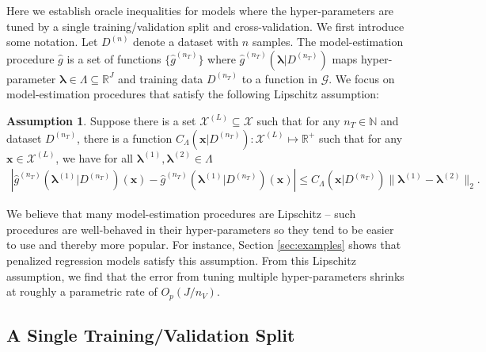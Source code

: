 \documentclass[12pt]{article} %
\theoremstyle{definition}
\newtheorem{assump}{Assumption}
\begin{document}
Here we establish oracle inequalities for models where the hyper-parameters are tuned by a single training/validation split and cross-validation. We first introduce some notation.
Let $D^{(n)}$ denote a dataset with $n$ samples. The model-estimation procedure $\hat{g}$ is a set of functions $\{\hat{g}^{(n_T)}\}$ where $\hat{g}^{(n_T)}(\boldsymbol{\lambda} | D^{(n_T)})$ maps hyper-parameter $\boldsymbol{\lambda} \in \Lambda \subseteq \mathbb{R}^J$ and training data $D^{(n_T)}$ to a function in $\mathcal{G}$.
We focus on model-estimation procedures that satisfy the following Lipschitz assumption:
\begin{assump}
	\label{assump:lipschitz}
	Suppose there is a set $\mathcal{X}^{(L)} \subseteq \mathcal{X}$ such that for any $n_T \in \mathbb{N}$ and dataset $D^{(n_T)}$, there is a function $C_\Lambda(\boldsymbol{x} | D^{(n_T)}) : \mathcal{X}^{(L)} \mapsto \mathbb{R}^+$ such that for any $\boldsymbol{x} \in \mathcal{X}^{(L)}$, we have for all $\boldsymbol{\lambda}^{(1)}, \boldsymbol{\lambda}^{(2)} \in \Lambda$
	\begin{align}
	\left |
	\hat{g}^{(n_T)}(\boldsymbol{\lambda}^{(1)}|D^{(n_T)})(\boldsymbol{x}) - \hat{g}^{(n_T)}(\boldsymbol{\lambda}^{(1)}|D^{(n_T)})(\boldsymbol{x}) \right |
	\le C_\Lambda(\boldsymbol{x}|D^{(n_T)}) \|\boldsymbol{\lambda}^{(1)} - \boldsymbol{\lambda}^{(2)}\|_2.
	\end{align}
\end{assump}
\noindent
We believe that many model-estimation procedures are Lipschitz -- such procedures are well-behaved in their hyper-parameters so they tend to be easier to use and thereby more popular.
For instance, Section \ref{sec:examples} shows that penalized regression models satisfy this assumption.
From this Lipschitz assumption, we find that the error from tuning multiple hyper-parameters shrinks at roughly a parametric rate of $O_p(J/n_V)$.

\subsection{A Single Training/Validation Split}\label{sec:single}
\end{document}
